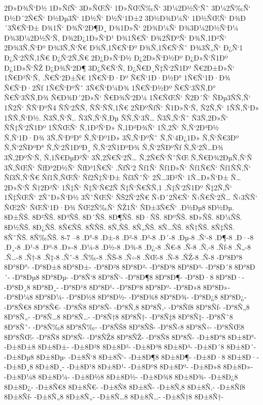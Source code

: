 {2Ð»Ð¾Ñ‘Ð½
1Ð»ÑƒÑ‘
3Ð»ÑŒÑ‘
1Ð»ÑŒÑ‰Ñ‘
3Ð¼2Ð½Ñ‘Ñˆ
3Ð¼2Ñ‰Ñ‘
Ð½Ð´2Ñ€Ñ‘
Ð½Ðµ3Ñ‘
1Ð½Ñ‘
Ð½Ñ‘1Ð±2
3Ð½Ð¾Ð¼Ñ‘
1Ð½ÑŒÑ‘
Ð¾Ð´3Ñ€Ñ‘Ð±
Ð¾1Ñ‘
Ð¾Ñ‘2Ð¶Ð¸
Ð¾1Ð»Ñ‘
2Ð¾Ð¼Ñ‘
Ð¾3Ð¼2Ð½Ñ‘Ð¼
Ð¾3Ð¼2Ð½Ñ‘Ñ‚
Ð¾2Ð¿1Ð»Ñ‘Ð¹
Ð¾1Ñ€Ñ‘
Ð¾2ÑÐºÑ‘
Ð¾Ñ‚1Ð²Ñ‘
2Ð¾3Ñ‚Ñ‘Ðº
Ð¾3Ñ‚Ñ‘Ñ€
Ð¾Ñ‚1Ñ€Ñ‘Ðº
Ð¾Ñ‚1Ñ€Ñ‘Ñˆ
Ð¾3Ñ„Ñ‘
Ð¿Ñ‘1
Ð¿Ñ‘2ÑÑ‚1Ñ€
Ð¿Ñ‘2Ñ‚Ñ€
2Ð¿Ð»Ñ‘Ð½
Ð¿2Ð»Ñ‘Ð½Ðº
Ð¿Ð»Ñ‘Ñ1Ðº
Ð¿1Ð»Ñ‘ÑŽ
Ð¿Ð¾Ñ‘2Ð¶
3Ð¿Ñ€Ñ‘Ñ‚
Ð¿Ñ€Ð¸Ñ‡Ñ‘2Ñ1Ðº
Ñ€2Ð±Ð»Ñ‘
1Ñ€Ð²Ñ‘Ñ‚
.Ñ€Ñ‘2Ð±Ñ€
1Ñ€Ñ‘Ð·Ðº
Ñ€Ñ‘1Ð·Ð½Ð°
1Ñ€Ñ‘1Ð·Ð¾
Ñ€Ñ‘Ð·2Ñƒ
1Ñ€Ñ‘ÐºÑˆ
3Ñ€Ñ‘Ð¼Ð¾
1Ñ€Ñ‘Ð½Ðº
Ñ€Ñ‘3ÑÑ‚Ð°
Ñ€Ñ‘3ÑÑ‚Ð¾
Ñ€Ð¾Ð´2Ð»Ñ‘
Ñ€Ð¾Ñ‘2Ð¼
1Ñ€ÑŒÑ‘
Ñ2Ð´Ñ‘
ÑÐµ3ÑÑ‚Ñ‘
1Ñ2Ñ‘
ÑÑ‘ÐºÑ4
ÑÑ‘2ÑÑ‚
ÑÑ‘ÑÑ‚1Ñ€
2ÑÐºÑƒÑ‘
Ñ1Ð»Ñ‘Ñ‚
Ñ2Ñ‚Ñ‘
1ÑÑ‚Ñ‘Ð»
1ÑÑ‚Ñ‘Ð½.
Ñ3Ñ‚Ñ‘Ñ‚.
Ñ3Ñ‚Ñ‘Ñ‚Ðµ
ÑÑ‚Ñ‘3Ñ…
Ñ3Ñ‚Ñ‘Ñˆ
Ñ3Ñ‚2Ð»Ñ‘
ÑÑ‡Ñ‘2Ñ1Ðº
1ÑÑŒÑ‘
Ñ‚1Ð²Ñ‘Ð»
Ñ‚1Ð²Ð¾Ñ‘
1Ñ‚2Ñ‘
Ñ‚Ñ‘2Ð³Ð½
Ñ‚Ñ‘1Ð·Ð¾
3Ñ‚Ñ‘ÐºÐ°
Ñ‚Ñ‘Ðº1Ð»
3Ñ‚Ñ‘ÐºÑˆ
Ñ‚Ñ‘4Ð¿1Ð»
Ñ‚Ñ‘Ñ€3Ðº
Ñ‚Ñ‘2ÑÐºÐ°
Ñ‚Ñ‘2Ñ1ÐºÐ¸
Ñ‚Ñ‘2Ñ1ÐºÐ¾
Ñ‚Ñ‘2ÑÐºÑƒ
Ñ‚Ñ‘2Ñ…Ð¾
3Ñ‚2ÐºÑ‘Ñ‚
Ñ‚1Ñ€ÐµÐ²Ñ‘
3Ñ‚2Ñ€Ñ‘2Ñ…
Ñ‚2Ñ€Ñ‘ÑˆÑŒ
Ñ‚Ñ€Ð¾2ÐµÑ‚Ñ‘Ñ
3Ñ‚ÑŒÑ‘
ÑƒÐ³2Ð½Ñ‘
ÑƒÐ³1Ñ€Ñ‘
.ÑƒÑ‘2
Ñƒ1Ñ‘
Ñƒ1Ð»Ñ‘
Ñƒ1Ñ€Ñ‘
Ñƒ1ÑÑ‚Ñ‘
Ñƒ3Ñ‚Ñ‘Ñ€
Ñƒ1Ñ‚ÑŒÑ‘
Ñƒ2Ñ‡Ñ‘Ð±
Ñƒ3ÑˆÑ‘
2Ñ…3Ð²Ñ‘
1Ñ…Ð»Ñ‘Ð±
Ñ…2Ð»Ñ‘Ñ
Ñ†2Ð²Ñ‘
1Ñ‡Ñ‘
Ñ‡Ñ‘Ñ€2Ñ
Ñ‡Ñ‘Ñ€ÑÑ‚1
.Ñ‡Ñ‘2Ñ1Ðº
Ñ‡2Ñ‚Ñ‘
1Ñ‡ÑŒÑ‘
2ÑˆÐ»Ñ‘Ð½
3ÑˆÑŒÑ‘
ÑŠ2Ñ‘2Ñ€
Ñ‹Ð´2Ñ€Ñ‘
Ñ‹Ñ€Ñ‘2Ñ…
Ñ‹3ÑÑ‘
ÑŒ2Ñ‘
ÑŒÑ‘1Ð·Ð¾
ÑŒ2Ñ‰Ñ‘
ÑŽ1Ñ‘
ÑÐ±3Ñ€Ñ‘
.Ð½Ðµ8
8Ð½Ðµ.
8Ð±ÑŠ.
8Ð²ÑŠ.
8Ð³ÑŠ.
8Ð´ÑŠ.
8Ð¶ÑŠ.
8Ð·ÑŠ.
8ÐºÑŠ.
8Ð»ÑŠ.
8Ð¼ÑŠ.
8Ð½ÑŠ.
8Ð¿ÑŠ.
8Ñ€ÑŠ.
8ÑÑŠ.
8Ñ‚ÑŠ.
8Ñ„ÑŠ.
8Ñ…ÑŠ.
8Ñ†ÑŠ.
8Ñ‡ÑŠ.
8ÑˆÑŠ.
8Ñ‰ÑŠ.
8-7
--8
.Ð°-8
.Ð±-8
.Ð²-8
.Ð³-8
.Ð´-8
.Ðµ-8
.Ñ‘-8
.Ð¶-8
.Ð·-8
.Ð¸-8
.Ð¹-8
.Ðº-8
.Ð»-8
.Ð¼-8
.Ð½-8
.Ð¾-8
.Ð¿-8
.Ñ€-8
.Ñ-8
.Ñ‚-8
.Ñƒ-8
.Ñ„-8
.Ñ…-8
.Ñ†-8
.Ñ‡-8
.Ñˆ-8
.Ñ‰-8
.ÑŠ-8
.Ñ‹-8
.ÑŒ-8
.Ñ-8
.ÑŽ-8
.Ñ-8
-Ð°8Ð°8
8Ð°8Ð°-
-Ð°8Ð±8
8Ð°8Ð±-
-Ð°8Ð²8
8Ð°8Ð²-
-Ð°8Ð³8
8Ð°8Ð³-
-Ð°8Ð´8
8Ð°8Ð´-
-Ð°8Ðµ8
8Ð°8Ðµ-
-Ð°8Ñ‘8
8Ð°8Ñ‘-
-Ð°8Ð¶8
8Ð°8Ð¶-
-Ð°8Ð·8
8Ð°8Ð·-
-Ð°8Ð¸8
8Ð°8Ð¸-
-Ð°8Ð¹8
8Ð°8Ð¹-
-Ð°8Ðº8
8Ð°8Ðº-
-Ð°8Ð»8
8Ð°8Ð»-
-Ð°8Ð¼8
8Ð°8Ð¼-
-Ð°8Ð½8
8Ð°8Ð½-
-Ð°8Ð¾8
8Ð°8Ð¾-
-Ð°8Ð¿8
8Ð°8Ð¿-
-Ð°8Ñ€8
8Ð°8Ñ€-
-Ð°8Ñ8
8Ð°8Ñ-
-Ð°8Ñ‚8
8Ð°8Ñ‚-
-Ð°8Ñƒ8
8Ð°8Ñƒ-
-Ð°8Ñ„8
8Ð°8Ñ„-
-Ð°8Ñ…8
8Ð°8Ñ…-
-Ð°8Ñ†8
8Ð°8Ñ†-
-Ð°8Ñ‡8
8Ð°8Ñ‡-
-Ð°8Ñˆ8
8Ð°8Ñˆ-
-Ð°8Ñ‰8
8Ð°8Ñ‰-
-Ð°8ÑŠ8
8Ð°8ÑŠ-
-Ð°8Ñ‹8
8Ð°8Ñ‹-
-Ð°8ÑŒ8
8Ð°8ÑŒ-
-Ð°8Ñ8
8Ð°8Ñ-
-Ð°8ÑŽ8
8Ð°8ÑŽ-
-Ð°8Ñ8
8Ð°8Ñ-
-Ð±8Ð°8
8Ð±8Ð°-
-Ð±8Ð±8
8Ð±8Ð±-
-Ð±8Ð²8
8Ð±8Ð²-
-Ð±8Ð³8
8Ð±8Ð³-
-Ð±8Ð´8
8Ð±8Ð´-
-Ð±8Ðµ8
8Ð±8Ðµ-
-Ð±8Ñ‘8
8Ð±8Ñ‘-
-Ð±8Ð¶8
8Ð±8Ð¶-
-Ð±8Ð·8
8Ð±8Ð·-
-Ð±8Ð¸8
8Ð±8Ð¸-
-Ð±8Ð¹8
8Ð±8Ð¹-
-Ð±8Ðº8
8Ð±8Ðº-
-Ð±8Ð»8
8Ð±8Ð»-
-Ð±8Ð¼8
8Ð±8Ð¼-
-Ð±8Ð½8
8Ð±8Ð½-
-Ð±8Ð¾8
8Ð±8Ð¾-
-Ð±8Ð¿8
8Ð±8Ð¿-
-Ð±8Ñ€8
8Ð±8Ñ€-
-Ð±8Ñ8
8Ð±8Ñ-
-Ð±8Ñ‚8
8Ð±8Ñ‚-
-Ð±8Ñƒ8
8Ð±8Ñƒ-
-Ð±8Ñ„8
8Ð±8Ñ„-
-Ð±8Ñ…8
8Ð±8Ñ…-
-Ð±8Ñ†8
8Ð±8Ñ†-
}

